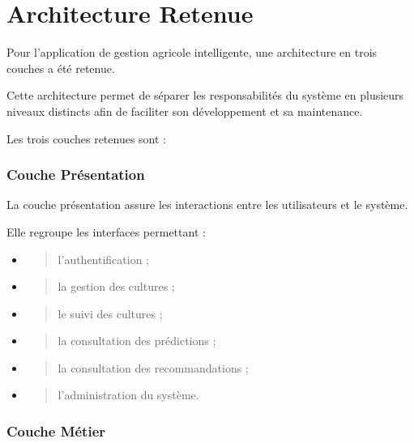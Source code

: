 \hypertarget{architecture-retenue}{%
\section{Architecture Retenue}\label{architecture-retenue}}

Pour l'application de gestion agricole intelligente, une architecture en
trois couches a été retenue.

Cette architecture permet de séparer les responsabilités du système en
plusieurs niveaux distincts afin de faciliter son développement et sa
maintenance.

Les trois couches retenues sont :

\hypertarget{couche-pruxe9sentation}{%
\subsubsection{Couche Présentation}\label{couche-pruxe9sentation}}

La couche présentation assure les interactions entre les utilisateurs et
le système.

Elle regroupe les interfaces permettant :

\begin{itemize}
\item
  \begin{quote}
  l'authentification ;
  \end{quote}
\item
  \begin{quote}
  la gestion des cultures ;
  \end{quote}
\item
  \begin{quote}
  le suivi des cultures ;
  \end{quote}
\item
  \begin{quote}
  la consultation des prédictions ;
  \end{quote}
\item
  \begin{quote}
  la consultation des recommandations ;
  \end{quote}
\item
  \begin{quote}
  l'administration du système.
  \end{quote}
\end{itemize}

\hypertarget{couche-muxe9tier}{%
\subsubsection{Couche Métier}\label{couche-muxe9tier}}

